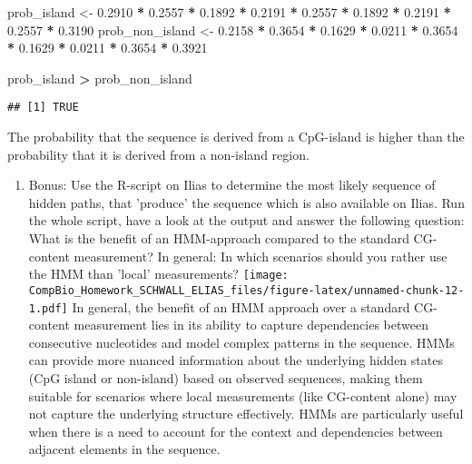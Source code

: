 \documentclass[
]{article}
\newenvironment{Shaded}{\begin{snugshade}}{\end{snugshade}}
\newcommand{\FloatTok}[1]{\textcolor[rgb]{0.00,0.00,0.81}{#1}}
\newcommand{\NormalTok}[1]{#1}
\newcommand{\OtherTok}[1]{\textcolor[rgb]{0.56,0.35,0.01}{#1}}
\newcommand{\SpecialCharTok}[1]{\textcolor[rgb]{0.81,0.36,0.00}{\textbf{#1}}}
\providecommand{\tightlist}{%
  \setlength{\itemsep}{0pt}\setlength{\parskip}{0pt}}
\begin{document}
\begin{Shaded}
\begin{Highlighting}[]
\NormalTok{prob\_island }\OtherTok{\textless{}{-}} \FloatTok{0.2910} \SpecialCharTok{*} \FloatTok{0.2557} \SpecialCharTok{*} \FloatTok{0.1892} \SpecialCharTok{*}  \FloatTok{0.2191} \SpecialCharTok{*} \FloatTok{0.2557} \SpecialCharTok{*} \FloatTok{0.1892} \SpecialCharTok{*} \FloatTok{0.2191} \SpecialCharTok{*} \FloatTok{0.2557} \SpecialCharTok{*} \FloatTok{0.3190}
\NormalTok{prob\_non\_island }\OtherTok{\textless{}{-}} \FloatTok{0.2158} \SpecialCharTok{*} \FloatTok{0.3654} \SpecialCharTok{*} \FloatTok{0.1629} \SpecialCharTok{*}  \FloatTok{0.0211} \SpecialCharTok{*} \FloatTok{0.3654} \SpecialCharTok{*}  \FloatTok{0.1629} \SpecialCharTok{*} \FloatTok{0.0211} \SpecialCharTok{*} \FloatTok{0.3654} \SpecialCharTok{*} \FloatTok{0.3921}

\NormalTok{prob\_island }\SpecialCharTok{\textgreater{}}\NormalTok{ prob\_non\_island}
\end{Highlighting}
\end{Shaded}

\begin{verbatim}
## [1] TRUE
\end{verbatim}

The probability that the sequence is derived from a CpG-island is higher
than the probability that it is derived from a non-island region.

\begin{enumerate}
\def\labelenumi{\alph{enumi})}
\setcounter{enumi}{3}
\tightlist
\item
  Bonus: Use the R-script on Ilias to determine the most likely sequence
  of hidden paths, that 'produce' the sequence which is also available
  on Ilias. Run the whole script, have a look at the output and answer
  the following question: What is the benefit of an HMM-approach
  compared to the standard CG-content measurement? In general: In which
  scenarios should you rather use the HMM than 'local' measurements?
  \texttt{[image: CompBio\_Homework\_SCHWALL\_ELIAS\_files/figure-latex/unnamed-chunk-12-1.pdf]}
  In general, the benefit of an HMM approach over a standard CG-content
  measurement lies in its ability to capture dependencies between
  consecutive nucleotides and model complex patterns in the sequence.
  HMMs can provide more nuanced information about the underlying hidden
  states (CpG island or non-island) based on observed sequences, making
  them suitable for scenarios where local measurements (like CG-content
  alone) may not capture the underlying structure effectively. HMMs are
  particularly useful when there is a need to account for the context
  and dependencies between adjacent elements in the sequence.
\end{enumerate}
\end{document}
